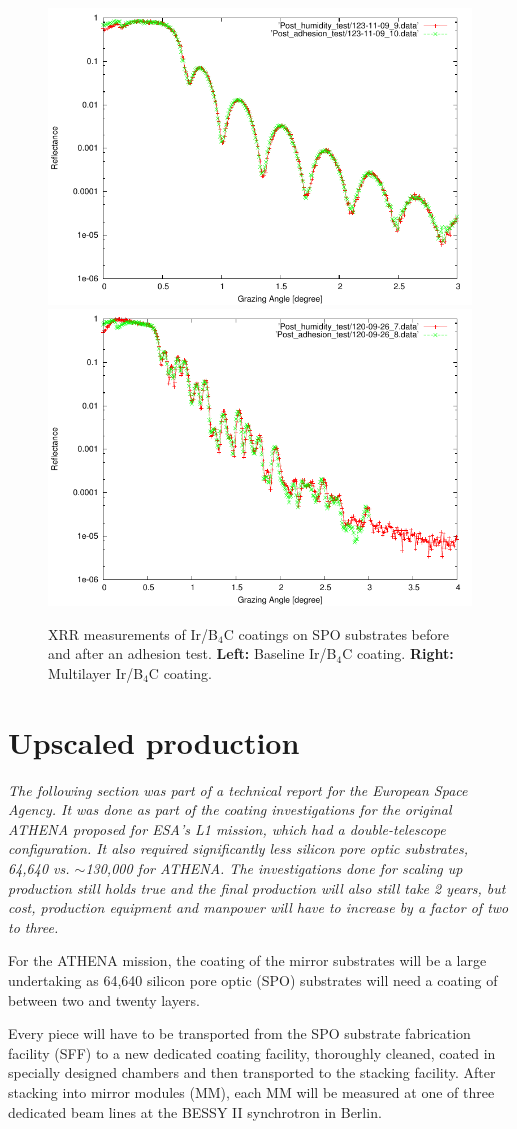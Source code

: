 \begin{figure}[!h]
  \center  \includegraphics[width=0.47\linewidth]{figures/athena/coating_on_spo/123-11-09_Adhesion_test.pdf}
  \includegraphics[width=0.47\linewidth]{figures/athena/coating_on_spo/120-09-26_Adhesion_test.pdf}
\caption{\footnotesize XRR measurements of Ir/B$_4$C coatings on SPO substrates before and after an adhesion test. \textbf{Left:} Baseline Ir/B$_4$C coating. \textbf{Right:} Multilayer Ir/B$_4$C coating.}\label{fig:qa_adh}
\end{figure}


\section{Upscaled production}\label{sec:athena_upscaled}

\emph{The following section was part of a technical report for the European Space Agency. It was done as part of the coating investigations for the original ATHENA proposed for ESA's L1 mission, which had a double-telescope configuration. It also required significantly less silicon pore optic substrates, 64,640 vs. $\sim$130,000 for ATHENA. The investigations done for scaling up production still holds true and the final production will also still take 2 years, but cost, production equipment and manpower will have to increase by a factor of two to three.}

For the ATHENA mission, the coating of the mirror substrates will be a large undertaking as 64,640 silicon pore optic (SPO) substrates will need a coating of between two and twenty layers.

Every piece will have to be transported from the SPO substrate fabrication facility (SFF) to a new dedicated coating facility, thoroughly cleaned, coated in specially designed chambers and then transported to the stacking facility. After stacking into mirror modules (MM), each MM will be measured at one of three dedicated beam lines at the BESSY II synchrotron in Berlin.

